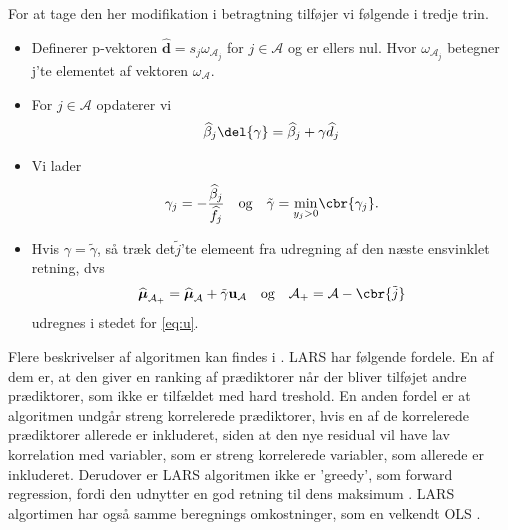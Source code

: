 For at tage den her modifikation i betragtning tilføjer vi følgende i tredje trin. 
\begin{itemize}
\item Definerer p-vektoren $\widehat{\textbf{d}} = s_j \omega_{\mathcal{A}_j}$ for $j \in \mathcal{A}$ og er ellers nul. Hvor $ \omega_{\mathcal{A}_j}$ betegner j'te elementet af vektoren $\omega_{\mathcal{A}}$. 
\item For $j \in \mathcal{A}$ opdaterer vi 
\begin{align*}
\widehat{\beta}_j \del{\gamma} = \widehat{\beta}_j + \gamma \widehat{d}_j 
\end{align*}
\item Vi lader 
\begin{align*}
\gamma_j = - \frac{\widehat{\beta}_j}{\widehat{f}_j} \quad \text{og} \quad \tilde\gamma = \underset{y_j > 0}{\min} \cbr{\gamma_j}. 
\end{align*}
\item Hvis $\gamma = \tilde{\gamma}$, så træk det$ \tilde{j}$'te elemeent fra udregning af den næste ensvinklet retning, dvs 
\begin{align*}
\widehat{\boldsymbol\mu}_{\mathcal{A}_+} = \widehat{\boldsymbol\mu}_\mathcal{A} + \tilde{\gamma} \textbf{u}_\mathcal{A} \quad \text{og} \quad \mathcal{A_+} = \mathcal{A}- \cbr{\tilde{j}}
\end{align*}
udregnes i stedet for \eqref{eq:u}.
\end{itemize}

Flere beskrivelser af algoritmen kan findes i \citep{efron}. 
LARS har følgende fordele.
En af dem er, at den giver en ranking af prædiktorer når der bliver tilføjet andre prædiktorer, som ikke er tilfældet med hard treshold. 
En anden fordel er at algoritmen undgår streng korrelerede prædiktorer, hvis en af de korrelerede prædiktorer allerede er inkluderet, siden at den nye residual vil have lav korrelation med variabler, som er streng korrelerede variabler, som allerede er inkluderet. 
Derudover er LARS algoritmen ikke er 'greedy', som forward regression, fordi den udnytter en god retning til dens maksimum . 
LARS algortimen har også samme beregnings omkostninger, som en velkendt OLS \citep{hui_hastie}. 
